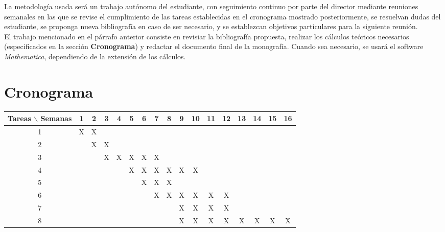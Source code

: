 \documentclass[prb,aps,preprintnumbers,amsmath,amssymb]{article}
\begin{document}
La metodolog\'ia usada ser\'a un trabajo aut\'onomo del estudiante, con seguimiento continuo por parte del director mediante reuniones semanales en las que se revise el cumplimiento de las tareas establecidas en el cronograma mostrado posteriormente, se resuelvan dudas del estudiante, se proponga nueva bibliograf\'ia en caso de ser necesario, y se establezcan objetivos particulares para la siguiente reuni\'on.\\

El trabajo mencionado en el p\'arrafo anterior consiste en revisiar la bibliograf\'ia propuesta, realizar los c\'alculos te\'oricos necesarios (especificados en la secci\'on \textbf{Cronograma}) y redactar el documento final de la monograf\'ia. Cuando sea necesario, se usar\'a el software \emph{Mathematica}, dependiendo de la extensi\'on de los c\'alculos.

\section{\label{crono}Cronograma}

\begin{table}[htb]
\centering
	\begin{tabular}{|c|cccccccccccccccc| }
	\hline
	Tareas $\backslash$ Semanas & 1 & 2 & 3 & 4 & 5 & 6 & 7 & 8 & 9 & 10 & 11 & 12 & 13 & 14 & 15 & 16  \\
	\hline
	1 & X & X &   &   &   &   &   &  &  &   &   &   &   &   &   &   \\
	2 &   & X & X &   &  &  &  &   &   &  &  &  &   &  &  &   \\
	3 &   &   & X & X &  X & X  & X &  &   &   &   &  &   &   &  &   \\
	4 &   &   &   &   & X & X & X & X & X & X &   &   &   &   &   &   \\
	5 &   &   &   &   &  &  X & X  & X  &  &   &   &  &   &   &  &   \\
	6 &   &   &   &   &  &   & X  & X  & X & X  & X  & X &   &   &  &   \\
	7 &   &   &   &   &  &   &   &   & X & X  & X  & X &   &   &  &   \\
	8 &   &   &   &   &  &   &   &   & X &  X & X  & X & X  & X  & X & X  \\
	\hline
	\end{tabular}
\end{table}
\vspace{1mm}
\end{document}
